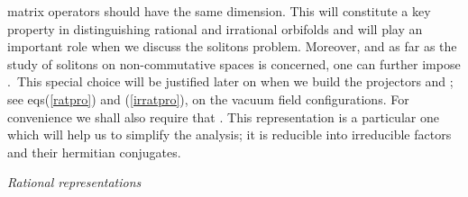 \documentclass[a4paper,12pt]{article}
\begin{document}
matrix operators should have the same dimension. This will
constitute a key property in distinguishing rational and
irrational \coordHE{} orbifolds and will play an important
role when we discuss the solitons problem. Moreover, and as far as
the study of solitons on non-commutative spaces is concerned, one
can further impose \coordHE{}.\
This special choice will be justified later on when we build the projectors \myHighlight{$%
\Pi _{i}$}\coordHE{} and \myHighlight{$\mathcal{P}_{N_{i}+M_{i}\theta _{i}}$}\coordHE{}; see eqs(\ref{ratpro}) and (\ref{irratpro}),
on the vacuum field configurations. For convenience we shall
also require that \coordHE{}. This representation is a particular one
which will help us to simplify the analysis; it is reducible into
irreducible factors \myHighlight{$(A_{i},B_{i})$}\coordHE{} and their hermitian conjugates.

\bigskip

\textit{Rational representations }
\end{document}

